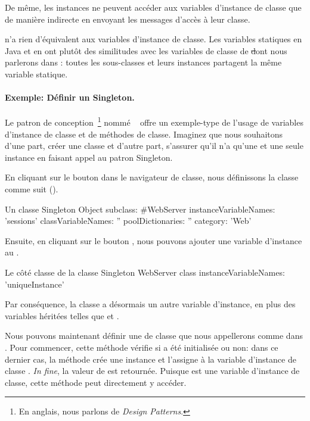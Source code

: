 \documentclass[a4paper,10pt,twoside]{book}
\begin{document}
De m\^eme, les instances ne peuvent acc\'eder aux variables d'instance de classe
que de mani\`ere indirecte en envoyant les messages d'acc\`es \`a leur classe.

 n'a rien d'\'equivalent aux variables d'instance de classe.  
Les variables statiques en Java et en  ont plut\^ot des similitudes 
avec les variables de classe de \st dont nous parlerons dans : toutes les sous-classes et leurs instances partagent la m\^eme variable statique.

\paragraph{Exemple: D\'efinir un Singleton.}
Le patron de conception~\footnote{En anglais, nous parlons de \emph{Design Patterns}.} nomm\'e ~\cite{Alpe98a} offre un exemple-type de l'usage de variables d'instance de classe et de m\'ethodes de classe.
Imaginez que nous souhaitons d'une part, cr\'eer une classe  et d'autre part, s'assurer qu'il n'a qu'une et une seule instance en faisant appel au patron Singleton.

En cliquant sur le bouton  dans le navigateur de classe, nous d\'efinissons la classe  comme suit ().

\begin{classdef}[singleton]{Un classe Singleton}
Object subclass: #WebServer
	instanceVariableNames: 'sessions' 	
	classVariableNames: '' 	
	poolDictionaries: ''
	category: 'Web'
\end{classdef}

Ensuite, en cliquant sur le bouton , nous pouvons ajouter une variable d'instance  au .

\begin{classdef}[webserver]{Le c\^ot\'e classe de la classe Singleton}
WebServer class 	
	instanceVariableNames: 'uniqueInstance'
\end{classdef}

Par cons\'equence, la classe  a d\'esormais un autre variable d'instance, en plus des variables h\'erit\'ees telles que  et .

Nous pouvons maintenant d\'efinir une  de classe que nous appellerons  comme dans . 
Pour commencer, cette m\'ethode v\'erifie si  a \'et\'e initialis\'ee ou non: dans ce dernier cas,
la m\'ethode cr\'ee une instance et l'assigne \`a la variable d'instance de classe .  
\emph{In fine}, la valeur de  est retourn\'ee.
Puisque  est une variable d'instance de classe, cette m\'ethode peut directement y acc\'eder.
    
\end{document}
